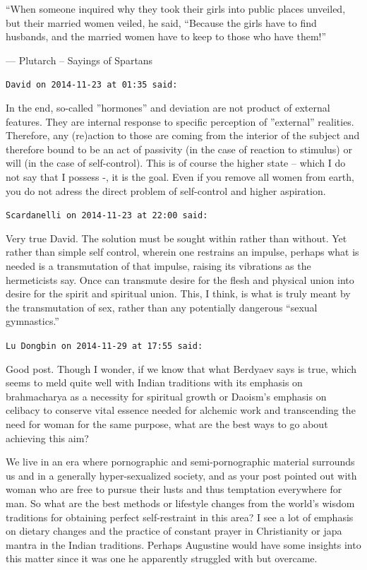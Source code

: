 \begin{footnotesize}
\begin{sffamily}
``When someone inquired why they took their girls into public places unveiled, but their married women veiled, he said, ``Because the girls have to find husbands, and the married women have to keep to those who have them!''

--- Plutarch -- Sayings of Spartans

\hfill

\texttt{David on 2014-11-23 at 01:35 said:}

In the end, so-called ''hormones'' and deviation are not product of external features. They are internal response to specific perception of ''external'' realities. Therefore, any (re)action to those are coming from the interior of the subject and therefore bound to be an act of passivity (in the case of reaction to stimulus) or will (in the case of self-control). This is of course the higher state -- which I do not say that I possess -, it is the goal. Even if you remove all women from earth, you do not adress the direct problem of self-control and higher aspiration.

\hfill

\texttt{Scardanelli on 2014-11-23 at 22:00 said:}

Very true David. The solution must be sought within rather than without. Yet rather than simple self control, wherein one restrains an impulse, perhaps what is needed is a transmutation of that impulse, raising its vibrations as the hermeticists say. Once can transmute desire for the flesh and physical union into desire for the spirit and spiritual union. This, I think, is what is truly meant by the transmutation of sex, rather than any potentially dangerous ``sexual gymnastics.''

\hfill

\texttt{Lu Dongbin on 2014-11-29 at 17:55 said:}

Good post. Though I wonder, if we know that what Berdyaev says is true, which seems to meld quite well with Indian traditions with its emphasis on brahmacharya as a necessity for spiritual growth or Daoism's emphasis on celibacy to conserve vital essence needed for alchemic work and transcending the need for woman for the same purpose, what are the best ways to go about achieving this aim?

We live in an era where pornographic and semi-pornographic material surrounds us and in a generally hyper-sexualized society, and as your post pointed out with woman who are free to pursue their lusts and thus temptation everywhere for man. So what are the best methods or lifestyle changes from the world's wisdom traditions for obtaining perfect self-restraint in this area? I see a lot of emphasis on dietary changes and the practice of constant prayer in Christianity or japa mantra in the Indian traditions. Perhaps Augustine would have some insights into this matter since it was one he apparently struggled with but overcame.


\end{sffamily}
\end{footnotesize}
